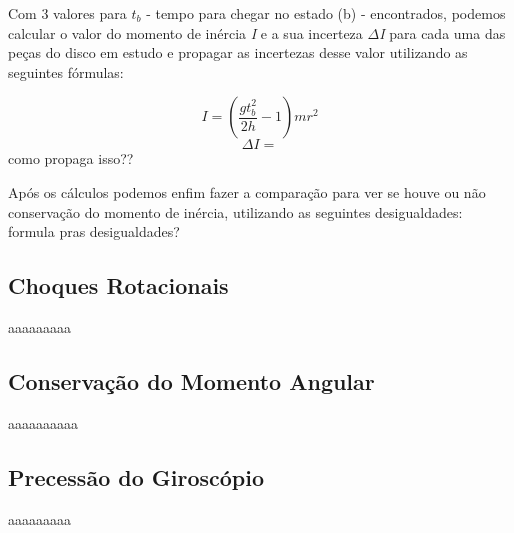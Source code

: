 Com 3 valores para \textit{$t_b$} - tempo para chegar no estado (b) - encontrados, podemos calcular o valor do momento de inércia \textit{I} e a sua incerteza \textit{$\Delta$I} para cada uma das peças do disco em estudo e propagar as incertezas desse valor utilizando as seguintes fórmulas:

\[I = \left( \frac{gt_b^2}{2h} - 1 \right) mr^2\] 
\[\Delta I = \] como propaga isso??

Após os cálculos podemos enfim fazer a comparação para ver se houve ou não conservação do momento de inércia, utilizando as seguintes desigualdades:\\

formula pras desigualdades?


\subsection{Choques Rotacionais}
aaaaaaaaa


\subsection{Conservação do Momento Angular}
aaaaaaaaaa


\subsection{Precessão do Giroscópio}
aaaaaaaaa
